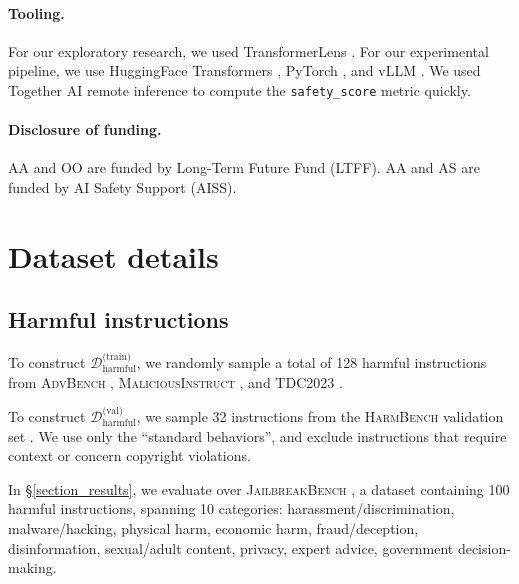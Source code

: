 \documentclass{article}
\begin{document}
\begin{ack}
\paragraph{Tooling.} For our exploratory research, we used TransformerLens \citep{nanda2022transformerlens}. For our experimental pipeline, we use HuggingFace Transformers \citep{wolf-etal-2020-transformers}, PyTorch \citep{paszke2019pytorch}, and vLLM \citep{kwon2023vllm}.
We used Together AI remote inference to compute the \texttt{safety\_score} metric quickly.

\paragraph{Disclosure of funding.}
AA and OO are funded by Long-Term Future Fund (LTFF).
AA and AS are funded by AI Safety Support (AISS).

\end{ack}

\newpage



\newpage
\appendix

\section{Dataset details}
\label{appendix_dataset}

\subsection{Harmful instructions}

To construct $\mathcal{D}_{\text{harmful}}^{\text{(train)}}$, we randomly sample a total of 128 harmful instructions from \textsc{AdvBench} \citep{zou2023universal}, \textsc{MaliciousInstruct} \citep{huang2023catastrophic}, and \textsc{TDC2023} \citep{mazeika2024harmbench, tdc2023}.

To construct $\mathcal{D}_{\text{harmful}}^{\text{(val)}}$, we sample 32 instructions from the \textsc{HarmBench} validation set \citep{mazeika2024harmbench}. We use only the ``standard behaviors'', and exclude instructions that require context or concern copyright violations.

In \S\ref{section_results}, we evaluate over \textsc{JailbreakBench} \citep{chao2024jailbreakbench}, a dataset containing 100 harmful instructions, spanning 10 categories: harassment/discrimination, malware/hacking, physical harm, economic harm, fraud/deception, disinformation, sexual/adult content, privacy, expert advice, government decision-making.
\end{document}
